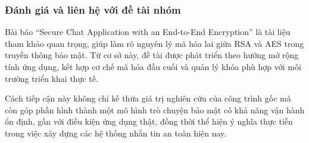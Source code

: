 \subsubsection{Đánh giá và liên hệ với đề tài nhóm}
\indent Bài báo “Secure Chat Application with an End-to-End Encryption” là tài liệu tham khảo quan trọng, giúp làm rõ nguyên lý mã hóa lai giữa RSA và AES trong truyền thông bảo mật. Từ cơ sở này, đề tài được phát triển theo hướng mở rộng tính ứng dụng, kết hợp cơ chế mã hóa đầu cuối và quản lý khóa phù hợp với môi trường triển khai thực tế.

\indent Cách tiếp cận này không chỉ kế thừa giá trị nghiên cứu của công trình gốc mà còn góp phần hình thành một mô hình trò chuyện bảo mật có khả năng vận hành ổn định, gần với điều kiện ứng dụng thật, đồng thời thể hiện ý nghĩa thực tiễn trong việc xây dựng các hệ thống nhắn tin an toàn hiện nay.
